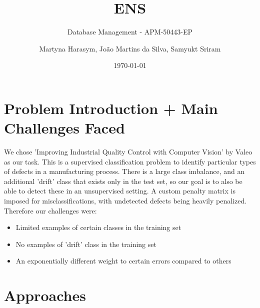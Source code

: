 \documentclass[a4paper]{article}
\author{Martyna Harasym, João Martins da Silva, Samyukt Sriram}
\date{\today}
\title{ENS}
\subtitle{Database Management - APM-50443-EP}%
\begin{document}
    \maketitle 
	
    \tableofcontents
    \newpage
	
    \section{Problem Introduction + Main Challenges Faced}
    We chose 'Improving Industrial Quality Control with Computer Vision'
by Valeo as our task. This is a supervised classification problem to identify particular types of defects in a manufacturing process. There is a large class imbalance, and an additional 'drift' class that exists only in the test set, so our goal is to also be able to detect these in an unsupervised setting. A custom penalty matrix is imposed for misclassifications, with undetected defects being heavily penalized. Therefore our challenges were:
\begin{itemize}
    \item Limited examples of certain classes in the training set
    \item No examples of 'drift' class in the training set
    \item An exponentially different weight to certain errors compared to others
\end{itemize}
    \section{Approaches}
\end{document}
